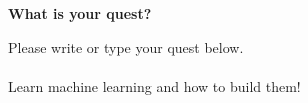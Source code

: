 \item {} {\bf What is your quest?}

Please write or type your quest below.\\\\
Learn machine learning and how to build them!
